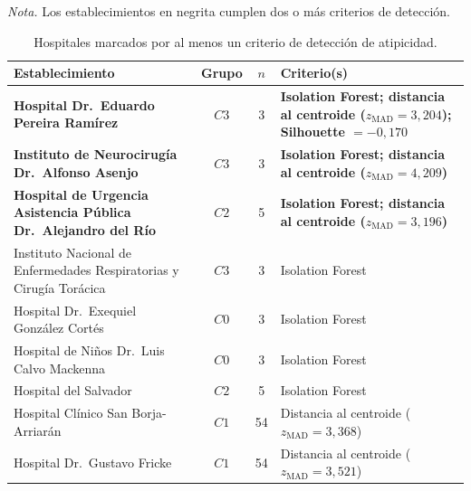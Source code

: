 \begin{table}[htbp]
\centering
\caption{Hospitales marcados por al menos un criterio de detección de atipicidad.}
\label{tab:outliers}
\par\smallskip
\begin{minipage}{\textwidth}
\normalsize\raggedright
\textit{Nota.} Los establecimientos en negrita cumplen dos o más criterios de detección.
\end{minipage}

\renewcommand{\arraystretch}{1.15}
\begin{tabular}{p{5.4cm} c c p{5.3cm}}
\toprule
\textbf{Establecimiento} & \textbf{Grupo} & \textbf{$n$} & \textbf{Criterio(s)} \\
\midrule

\textbf{Hospital Dr.\ Eduardo Pereira Ramírez}
& $C3$ & 3 &
\textbf{Isolation Forest; distancia al centroide ($z_{\mathrm{MAD}}=3{,}204$); Silhouette $=-0{,}170$} \\

\textbf{Instituto de Neurocirugía Dr.\ Alfonso Asenjo}
& $C3$ & 3 &
\textbf{Isolation Forest; distancia al centroide ($z_{\mathrm{MAD}}=4{,}209$)} \\

\textbf{Hospital de Urgencia Asistencia Pública Dr.\ Alejandro del Río}
& $C2$ & 5 &
\textbf{Isolation Forest; distancia al centroide ($z_{\mathrm{MAD}}=3{,}196$)} \\

Instituto Nacional de Enfermedades Respiratorias y Cirugía Torácica
& $C3$ & 3 &
Isolation Forest \\

Hospital Dr.\ Exequiel González Cortés
& $C0$ & 3 &
Isolation Forest \\

Hospital de Niños Dr.\ Luis Calvo Mackenna
& $C0$ & 3 &
Isolation Forest \\

Hospital del Salvador
& $C2$ & 5 &
Isolation Forest \\

Hospital Clínico San Borja-Arriarán
& $C1$ & 54 &
Distancia al centroide ($z_{\mathrm{MAD}}=3{,}368$) \\

Hospital Dr.\ Gustavo Fricke
& $C1$ & 54 &
Distancia al centroide ($z_{\mathrm{MAD}}=3{,}521$) \\

\bottomrule
\end{tabular}
\end{table}

